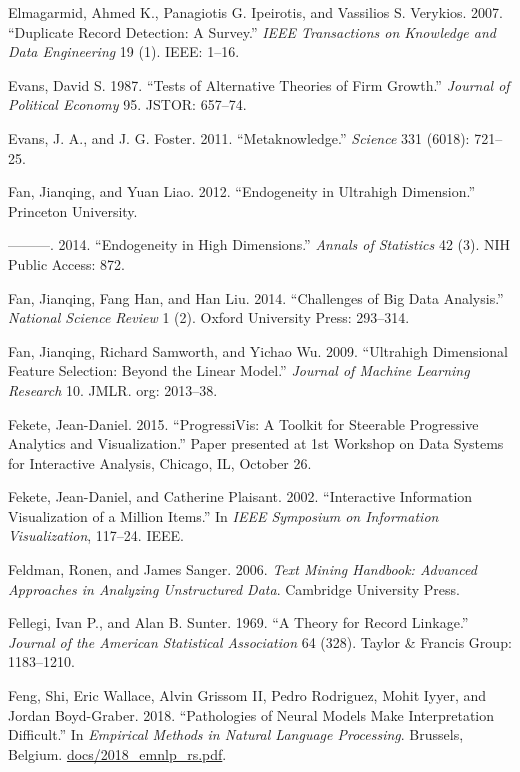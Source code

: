 \documentclass[]{krantz}
\begin{document}
\hypertarget{ref-elmagarmid2007duplicate}{}
Elmagarmid, Ahmed K., Panagiotis G. Ipeirotis, and Vassilios S.
Verykios. 2007. ``Duplicate Record Detection: A Survey.'' \emph{IEEE
Transactions on Knowledge and Data Engineering} 19 (1). IEEE: 1--16.

\hypertarget{ref-evans1987tests}{}
Evans, David S. 1987. ``Tests of Alternative Theories of Firm Growth.''
\emph{Journal of Political Economy} 95. JSTOR: 657--74.

\hypertarget{ref-Evans2011}{}
Evans, J. A., and J. G. Foster. 2011. ``Metaknowledge.'' \emph{Science}
331 (6018): 721--25.

\hypertarget{ref-FanLiao2012}{}
Fan, Jianqing, and Yuan Liao. 2012. ``Endogeneity in Ultrahigh
Dimension.'' Princeton University.

\hypertarget{ref-fan2014endogeneity}{}
---------. 2014. ``Endogeneity in High Dimensions.'' \emph{Annals of
Statistics} 42 (3). NIH Public Access: 872.

\hypertarget{ref-fan2014challenges}{}
Fan, Jianqing, Fang Han, and Han Liu. 2014. ``Challenges of Big Data
Analysis.'' \emph{National Science Review} 1 (2). Oxford University
Press: 293--314.

\hypertarget{ref-fan2009ultrahigh}{}
Fan, Jianqing, Richard Samworth, and Yichao Wu. 2009. ``Ultrahigh
Dimensional Feature Selection: Beyond the Linear Model.'' \emph{Journal
of Machine Learning Research} 10. JMLR. org: 2013--38.

\hypertarget{ref-fekete2015progressivis}{}
Fekete, Jean-Daniel. 2015. ``ProgressiVis: A Toolkit for Steerable
Progressive Analytics and Visualization.'' Paper presented at 1st
Workshop on Data Systems for Interactive Analysis, Chicago, IL, October
26.

\hypertarget{ref-fekete2002interactive}{}
Fekete, Jean-Daniel, and Catherine Plaisant. 2002. ``Interactive
Information Visualization of a Million Items.'' In \emph{IEEE Symposium
on Information Visualization}, 117--24. IEEE.

\hypertarget{ref-FeldmanSanger}{}
Feldman, Ronen, and James Sanger. 2006. \emph{Text Mining Handbook:
Advanced Approaches in Analyzing Unstructured Data}. Cambridge
University Press.

\hypertarget{ref-FS69}{}
Fellegi, Ivan P., and Alan B. Sunter. 1969. ``A Theory for Record
Linkage.'' \emph{Journal of the American Statistical Association} 64
(328). Taylor \& Francis Group: 1183--1210.

\hypertarget{ref-feng-18}{}
Feng, Shi, Eric Wallace, Alvin Grissom II, Pedro Rodriguez, Mohit Iyyer,
and Jordan Boyd-Graber. 2018. ``Pathologies of Neural Models Make
Interpretation Difficult.'' In \emph{Empirical Methods in Natural
Language Processing}. Brussels, Belgium. \url{docs/2018_emnlp_rs.pdf}.
\end{document}
